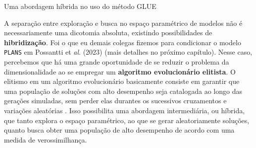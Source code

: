 \documentclass[./main.tex]{subfiles}
\begin{document}
\begin{simplebox}[
    float=ht!,
    label={destaque_abordagem_hibrida},
    nameref={Exploração híbrida}
    ]{Uma abordagem híbrida no uso do método GLUE}
    \footnotesize
    \begin{minipage}[t]{\linewidth}  
    \par A separação entre exploração e busca no espaço paramétrico de modelos não é necessariamente uma dicotomia absoluta, existindo possibilidades de \textbf{hibridização}. Foi o que eu demais colegas fizemos para condicionar o modelo \texttt{PLANS} em Possantti et \textit{al}. (2023) \cite{Possantti2023a} (mais detalhes no próximo capítulo). Nesse caso, percebemos que há uma grande oportunidade de se reduzir o problema da dimensionalidade ao se empregar um \textbf{algoritmo evolucionário elitista}. O elitismo em um algoritmo evolucionário basicamente consiste em garantir que uma população de soluções com alto desempenho seja catalogada ao longo das gerações simuladas, sem perder elas durantes os sucessivos cruzamentos e variações aleatórias \cite{eiben2015introduction}. Isso possibilita uma abordagem intermediária, ou híbrida, que tanto explora o espaço paramétrico, ao que se gerar aleatoriamente soluções, quanto busca obter uma população de alto desempenho de acordo com uma medida de verossimilhança.     
    \end{minipage}
    

\end{simplebox}
\end{document}

